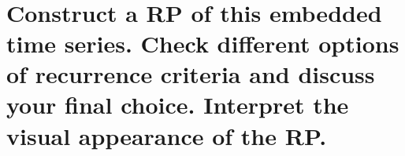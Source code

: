 \documentclass[11pt]{article}
\begin{document}
    \begin{center}
    \end{center}
    { \hspace*{\fill} \\}

    \hypertarget{construct-a-rp-of-this-embedded-time-series.-check-different-options-of-recurrence-criteria-and-discuss-your-final-choice.-interpret-the-visual-appearance-of-the-rp.}{%
\section{Construct a RP of this embedded time series. Check different
options of recurrence criteria and discuss your final choice. Interpret
the visual appearance of the
RP.}\label{construct-a-rp-of-this-embedded-time-series.-check-different-options-of-recurrence-criteria-and-discuss-your-final-choice.-interpret-the-visual-appearance-of-the-rp.}}
\end{document}

